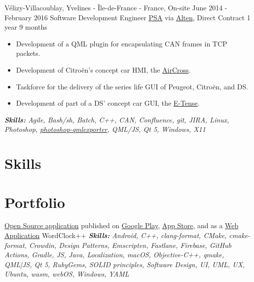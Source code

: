 \documentclass[11pt,a4paper,roman]{moderncv}
\begin{document}
\cventry
{Vélizy-Villacoublay, Yvelines - Île-de-France - France, On-site}
{June 2014 - February 2016}
{Software Development Engineer}
{\href{https://www.groupe-psa.com/en/}{PSA} via \href{https://www.alten.com}{Alten}, Direct Contract}
{1 year 9 months}
{}
{
\begin{itemize}
	\item Development of a QML plugin for encapsulating CAN frames in TCP packets.
	\item Development of Citroën's concept car HMI, the
	\href{https://www.media.stellantis.com/em-en/citroen/press/new-citroen-aircross-concept-car-an-invitation-to-travel-citroen-style}{AirCross}.
\item Taskforce for the delivery of the series life GUI of Peugeot, Citroën, and DS.
\item Development of part of a DS' concept car GUI, the \href{https://www.dsautomobiles.co.uk/ds-experience/concept-cars/ds-e-tense-performance.html}{E-Tense}.
\end{itemize}
{\textcolor{color2}{\textit{\textbf{Skills:}
	Agile,
	Bash/sh,
	Batch,
	C++,
	CAN,
	Confluence,
	git,
	JIRA,
	Linux,
	Photoshop,
	\href{https://github.com/qt-labs/photoshop-qmlexporter}{photoshop-qmlexporter},
	QML/JS,
	Qt 5,
	Windows,
	X11
}}}}

\section{Skills}


\section{Portfolio}

\cventry
{}
{\href{https://github.com/kokleeko/WordClock}{Open Source application} published on \href{https://play.google.com/store/apps/details?id=io.kokleeko.wordclock}{Google Play}, \href{https://apps.apple.com/us/app/wordclock/id1626068981}{App Store}, and as a \href{http://wordclock.kokleeko.io/}{Web Application}}
{WordClock++}
{}
{}
{
{\textcolor{color2}{\textit{\textbf{Skills:}
	Android,
	C++,
	clang-format,
	CMake,
	cmake-format,
	Crowdin,
	Design Patterns,
	Emscripten,
	Fastlane,
	Firebase,
	GitHub Actions,
	Gradle,
	JS,
	Java,
	Localization,
	macOS,
	Objective-C++,
	qmake,
	QML|JS,
	Qt 5,
	RubyGems,
	SOLID principles,
	Software Design,
	UI,
	UML,
	UX,
	Ubuntu,
	wasm,
	webOS,
	Windows,
	YAML
}}}}
\end{document}
